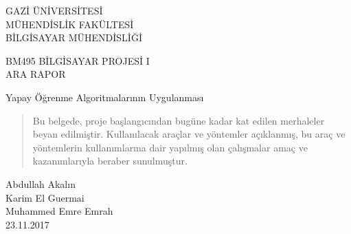 \renewcommand{\abstractname}{Özet}
\begin{titlepage}
    \begin{center}
        \begin{large}
            \vspace*{0.5cm}
            GAZİ ÜNİVERSİTESİ \\
            MÜHENDİSLİK FAKÜLTESİ \\
            BİLGİSAYAR MÜHENDİSLİĞİ

            \vfill
            BM495 BİLGİSAYAR PROJESİ I \\
            ARA RAPOR
            
            \vfill
            Yapay Öğrenme Algoritmalarının Uygulanması

            \vfill
            \begin{abstract}
                Bu belgede, proje başlangıcından bugüne kadar kat edilen merhaleler
                beyan edilmiştir. Kullanılacak araçlar ve yöntemler açıklanmış,
                bu araç ve yöntemlerin kullanımlarına dair yapılmış olan çalışmalar
                amaç ve kazanımlarıyla beraber sunulmuştur.
            \end{abstract}
            \vfill
            Abdullah Akalın\\Karim El Guermai\\Muhammed Emre Emrah\\

            \vfill
            \vspace{0.5cm}
            23.11.2017
        \end{large}
    \end{center}
\end{titlepage}
